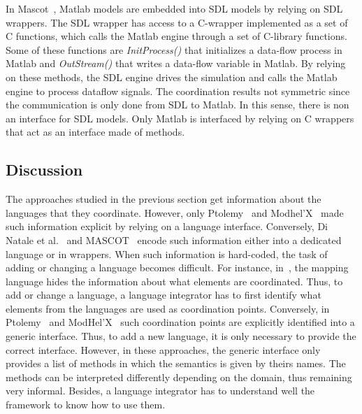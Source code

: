 In Mascot~\cite{mascotbib}, Matlab models are embedded into SDL models by relying on SDL wrappers. The SDL wrapper has access to a C-wrapper implemented as a set of C functions, which calls the Matlab engine through a set of C-library functions. Some of these functions are \emph{InitProcess()} that initializes a data-flow process in Matlab and \emph{OutStream()} that writes a data-flow variable in Matlab. By relying on these methods, the SDL engine drives the simulation and calls the Matlab engine to process dataflow signals. The coordination results not symmetric since the communication is only done from SDL to Matlab. In this sense, there is non an interface for SDL models. Only Matlab is interfaced by relying on C wrappers that act as an interface made of methods.
\subsection{Discussion}
The approaches studied in the previous section get information about the languages that they coordinate. However, only Ptolemy~\cite{ptoleframebib} and Modhel'X~\cite{modhelxbib} made such information explicit by relying on a language interface. Conversely, Di Natale et al.~\cite{dinatale} and MASCOT~\cite{mascotbib} encode such information either into a dedicated language or in wrappers. When such information is hard-coded, the task of adding or changing a language becomes difficult. For instance, in~\cite{dinatale}, the mapping language hides the information about what elements are coordinated. Thus, to add or change a language, a language integrator has to first identify what elements from the languages are used as coordination points. Conversely, in Ptolemy~\cite{ptoleframebib} and ModHel'X~\cite{modhelxbib} such coordination points are explicitly identified into a generic interface. Thus, to add a new language, it is only necessary to provide the correct interface. However, in these approaches, the generic interface only provides a list of methods in which the semantics is given by theirs names. The methods can be interpreted differently depending on the domain, thus remaining very informal. Besides, a language integrator has to understand well the framework to know how to use them. 

